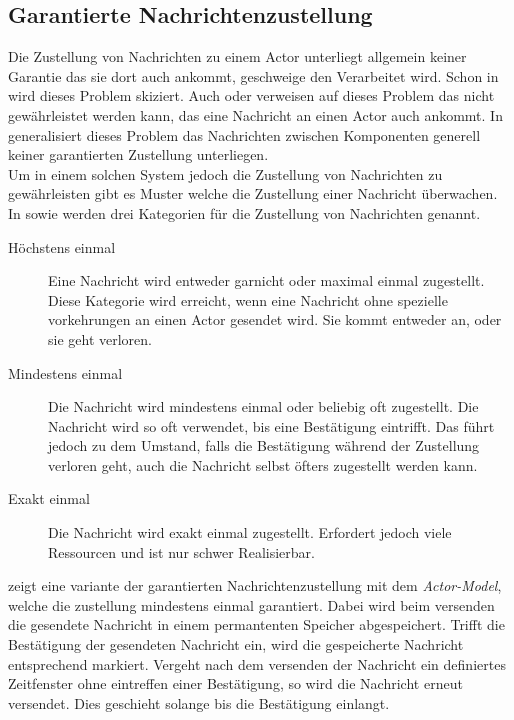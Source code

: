 \subsection{Garantierte Nachrichtenzustellung}
Die Zustellung von Nachrichten zu einem Actor unterliegt allgemein keiner Garantie das sie dort auch ankommt, geschweige den Verarbeitet wird. Schon in \cite{Agha1985ConcurrentParallelism} wird dieses Problem skiziert. Auch \cite{Vernon2015ReactiveAkka} oder \cite{CloudComputingPatterns2014} verweisen auf dieses Problem das nicht gewährleistet werden kann, das eine Nachricht an einen Actor auch ankommt. In \cite{CloudComputingPatterns2014} generalisiert dieses Problem das Nachrichten zwischen Komponenten generell keiner garantierten Zustellung unterliegen. \\
Um in einem solchen System jedoch die Zustellung von Nachrichten zu gewährleisten gibt es Muster welche die Zustellung einer Nachricht überwachen. In \cite{messagedeliveryreliabilityakkadocumentation} sowie \cite{hughmckee_2017} werden drei Kategorien für die Zustellung von Nachrichten genannt.
\begin{description}
    \item [Höchstens einmal] Eine Nachricht wird entweder garnicht oder maximal einmal zugestellt. Diese Kategorie wird erreicht, wenn eine Nachricht ohne spezielle vorkehrungen an einen Actor gesendet wird. Sie kommt entweder an, oder sie geht verloren.
    \item [Mindestens einmal] Die Nachricht wird mindestens einmal oder beliebig oft zugestellt. Die Nachricht wird so oft verwendet, bis eine Bestätigung eintrifft. Das führt jedoch zu dem Umstand, falls die Bestätigung während der Zustellung verloren geht, auch die Nachricht selbst öfters zugestellt werden kann.
    \item [Exakt einmal] Die Nachricht wird exakt einmal zugestellt. Erfordert jedoch viele Ressourcen und ist nur schwer Realisierbar.
\end{description}
\cite{Vernon2015ReactiveAkka} zeigt eine variante der garantierten Nachrichtenzustellung mit dem \textit{Actor-Model}, welche die zustellung mindestens einmal garantiert. Dabei wird beim versenden die gesendete Nachricht in einem permantenten Speicher abgespeichert. Trifft die Bestätigung der gesendeten Nachricht ein, wird die gespeicherte Nachricht entsprechend markiert. Vergeht nach dem versenden der Nachricht ein definiertes Zeitfenster ohne eintreffen einer Bestätigung, so wird die Nachricht erneut versendet. Dies geschieht solange bis die Bestätigung einlangt. \\
